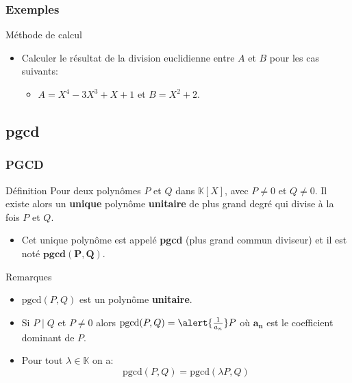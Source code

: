 \documentclass{beamer}
\newcommand{\setK}{\mathbb{K}}
\begin{document}
\begin{frame}[t]
  \frametitle{Exemples}
  \begin{block}{Méthode de calcul}
    \begin{itemize}
      \item  Calculer le résultat de la division euclidienne entre $A$ et $B$
        pour les cas suivants:\\[8pt]

        \begin{itemize}
          \item $A = X^4 -3X^3 + X + 1$ et $B = X^2 +2$.
        \end{itemize}
    \end{itemize} 
  \end{block}
  \pause
  \begin{center}
\end{center}
\end{frame}

\subsection{pgcd}
\begin{frame}[<+->]
  \frametitle{PGCD}
  
  \begin{block}{Définition}
    \small
    Pour deux polynômes $P$ et $Q$ dans $\setK[X]$, avec $P\neq 0$ et $Q\neq 0$.
    Il existe alors un \textbf{unique}  polynôme \textbf{\alert{unitaire}} de
    plus grand degré qui divise à la fois $P$ et $Q$.\\

    \begin{itemize}
      \item Cet unique polynôme est appelé \textbf{\alert{pgcd}} (plus grand
        commun diviseur) et il est noté $\mathbf{\text{pgcd}(P,Q)}$.
    \end{itemize}
  \end{block}
  \pause
  \begin{block}{Remarques}
    \small
    \begin{itemize}
      \item $\text{pgcd}(P,Q)$ est un polynôme \textbf{\alert{unitaire}}.\\[4pt]
      \item Si $P\;\vert\; Q$ et $P\neq 0$ alors $\text{pgcd}(P,Q) =
        \alert{\frac{1}{a_n}}P$ où $\mathbf{a_n}$ est le coefficient dominant de $P$.
      \item Pour tout $\lambda \in \setK$ on a:
        \begin{equation}
          \text{pgcd}(P, Q) = \text{pgcd}(\lambda P, Q)
        \end{equation}
    \end{itemize}  
  \end{block}
\end{frame}
\end{document}
